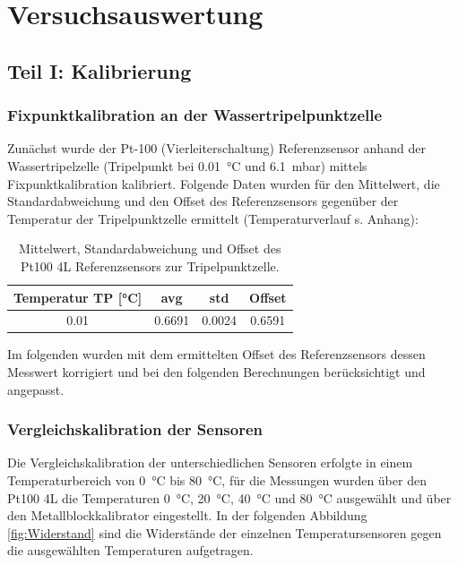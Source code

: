 \section{Versuchsauswertung}

\subsection{Teil I: Kalibrierung}

\subsubsection{Fixpunktkalibration an der Wassertripelpunktzelle}

Zunächst wurde der Pt-100 (Vierleiterschaltung) Referenzsensor anhand der Wassertripelzelle (Tripelpunkt bei \SI{0,01}{\celsius} und \SI{6,1}{\milli\bar}) mittels Fixpunktkalibration kalibriert. 
Folgende Daten wurden für den Mittelwert, die Standardabweichung und den Offset des Referenzsensors gegenüber der Temperatur der Tripelpunktzelle ermittelt (Temperaturverlauf s. Anhang): 

\begin{table}[H]
	\centering
	\caption{Mittelwert, Standardabweichung und Offset des Pt100 4L Referenzsensors zur Tripelpunktzelle.}
	\label{tab:VergleichTPZ}
	\begin{tabular}{cccc}
		Temperatur TP [\si{\celsius}] & avg & std & Offset \\ 
		\hline 
		\num{0.01} & \num{0.6691} & \num{0.0024} &  \num{0.6591}\\ 
	\end{tabular} 
\end{table}


Im folgenden wurden mit dem ermittelten Offset des Referenzsensors dessen Messwert korrigiert und bei den folgenden Berechnungen berücksichtigt und angepasst. 

\subsubsection{Vergleichskalibration der Sensoren}

Die Vergleichskalibration der unterschiedlichen Sensoren erfolgte in einem Temperaturbereich von \SI{0}{\celsius} bis \SI{80}{\celsius}, für die Messungen wurden über den Pt100 4L die Temperaturen \SI{0}{\celsius}, \SI{20}{\celsius}, \SI{40}{\celsius} und \SI{80}{\celsius} ausgewählt und über den Metallblockkalibrator eingestellt. In der folgenden Abbildung \ref{fig:Widerstand} sind die Widerstände der einzelnen Temperatursensoren gegen die ausgewählten Temperaturen aufgetragen. 

